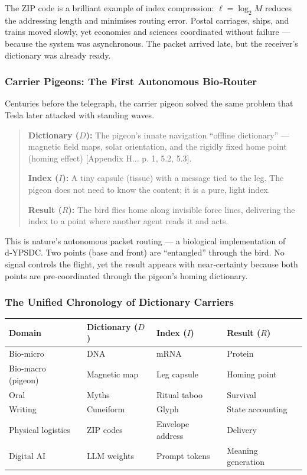 \documentclass[12pt,a4paper]{article}
\begin{document}
	The ZIP code is a brilliant example of index compression: \( \ell = \log_2 M \) reduces the addressing length and minimises routing error. Postal carriages, ships, and trains moved slowly, yet economies and sciences coordinated without failure — because the system was asynchronous. The packet arrived late, but the receiver’s dictionary was already ready.
	
	\subsubsection{Carrier Pigeons: The First Autonomous Bio‑Router}
	
	Centuries before the telegraph, the carrier pigeon solved the same problem that Tesla later attacked with standing waves.
	
	\begin{quote}
		\textbf{Dictionary ($D$):} The pigeon’s innate navigation “offline dictionary” — magnetic field maps, solar orientation, and the rigidly fixed home point (homing effect) [Appendix H... p. 1, 5.2, 5.3].
		
		\textbf{Index ($I$):} A tiny capsule (tissue) with a message tied to the leg. The pigeon does not need to know the content; it is a pure, light index.
		
		\textbf{Result ($R$):} The bird flies home along invisible force lines, delivering the index to a point where another agent reads it and acts.
	\end{quote}
	
	This is nature’s autonomous packet routing — a biological implementation of d‑YPSDC. Two points (base and front) are “entangled” through the bird. No signal controls the flight, yet the result appears with near‑certainty because both points are pre‑coordinated through the pigeon’s homing dictionary.
	
	\subsubsection{The Unified Chronology of Dictionary Carriers}
	
	\begin{center}
		\begin{tabular}{p{3cm}p{3.5cm}p{3.5cm}p{3cm}}
			\toprule
			\textbf{Domain} & \textbf{Dictionary ($D$)} & \textbf{Index ($I$)} & \textbf{Result ($R$)} \\
			\midrule
			Bio‑micro & DNA & mRNA & Protein \\
			Bio‑macro (pigeon) & Magnetic map & Leg capsule & Homing point \\
			Oral & Myths & Ritual taboo & Survival \\
			Writing & Cuneiform & Glyph & State accounting \\
			Physical logistics & ZIP codes & Envelope address & Delivery \\
			Digital AI & LLM weights & Prompt tokens & Meaning generation \\
			\bottomrule
		\end{tabular}
	\end{center}
	
\end{document}
